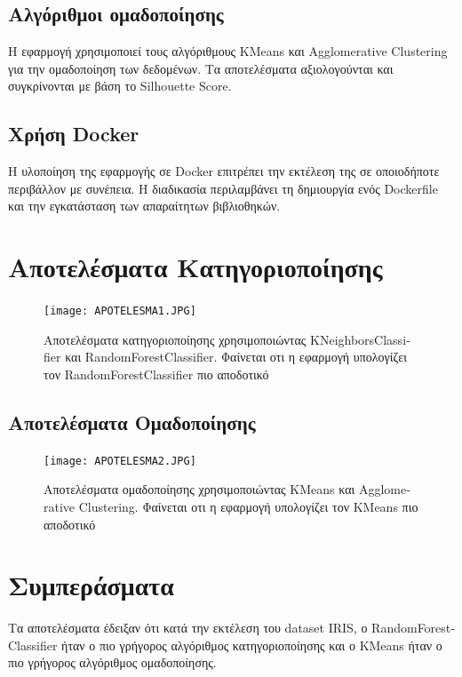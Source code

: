 \documentclass[a4paper,12pt]{article}
\begin{document}
\begin{itemize}
\subsection{Αλγόριθμοι ομαδοποίησης}
Η εφαρμογή χρησιμοποιεί τους αλγόριθμους \textlatin{KMeans} και \textlatin{Agglomerative Clustering} για την ομαδοποίηση των δεδομένων. Τα αποτελέσματα αξιολογούνται και συγκρίνονται με βάση το \textlatin{Silhouette Score}.

\subsection{Χρήση \textlatin{Docker}}
Η υλοποίηση της εφαρμογής σε \textlatin{Docker} επιτρέπει την εκτέλεση της σε οποιοδήποτε περιβάλλον με συνέπεια. Η διαδικασία περιλαμβάνει τη δημιουργία ενός \textlatin{Dockerfile} και την εγκατάσταση των απαραίτητων βιβλιοθηκών.

\section{Αποτελέσματα Κατηγοριοποίησης}
\begin{figure}[h!]
\centering
\texttt{[image: APOTELESMA1.JPG]}
\caption{Αποτελέσματα κατηγοριοποίησης χρησιμοποιώντας \textlatin{KNeighborsClassifier} και \textlatin{RandomForestClassifier}. Φαίνεται οτι η εφαρμογή υπολογίζει τον \textlatin{RandomForestClassifier} πιο αποδοτικό }
\end{figure}

\subsection{Αποτελέσματα Ομαδοποίησης}
\begin{figure}[h!]
\centering
\texttt{[image: APOTELESMA2.JPG]}
\caption{Αποτελέσματα ομαδοποίησης χρησιμοποιώντας \textlatin{KMeans} και \textlatin{Agglomerative Clustering}. Φαίνεται οτι η εφαρμογή υπολογίζει τον \textlatin{KMeans} πιο αποδοτικό}
\end{figure}

\section{Συμπεράσματα}
\label{sec:conclusion}


Τα αποτελέσματα έδειξαν ότι κατά την εκτέλεση του dataset \textlatin{IRIS}, ο \textlatin{RandomForestClassifier} ήταν ο πιο γρήγορος αλγόριθμος κατηγοριοποίησης και ο \textlatin{KMeans} ήταν ο πιο γρήγορος αλγόριθμος ομαδοποίησης.


\end{itemize}
\end{document}
